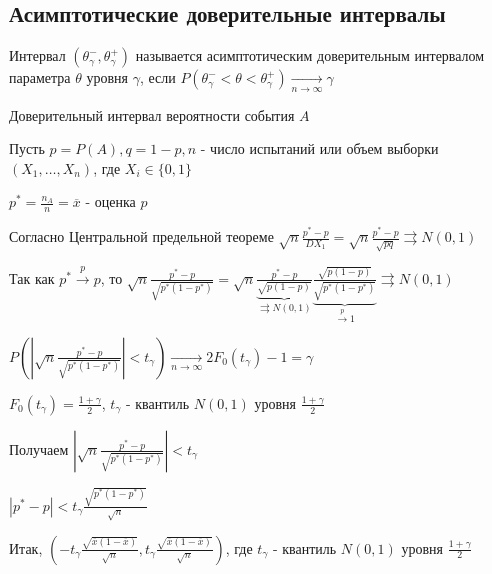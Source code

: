 \subsection{Асимптотические доверительные интервалы}

\Def Интервал $(\theta^-_\gamma, \theta^+_\gamma)$ называется асимптотическим доверительным интервалом параметра $\theta$ 
уровня $\gamma$, если $P(\theta^-_\gamma < \theta < \theta^+_\gamma) \underset{n \to \infty}{\longrightarrow} \gamma$

\Ex Доверительный интервал вероятности события $A$

Пусть $p = P(A), q = 1 - p, n$ - число испытаний или объем выборки $(X_1, \dots, X_n)$, где $X_i \in \{0, 1\}$

$p^* = \frac{n_A}{n} = \overline{x}$ - оценка $p$

Согласно Центральной предельной теореме $\sqrt{n} \frac{p^* - p}{D X_1} = \sqrt{n} \frac{p^* - p}{\sqrt{pq}} \rightrightarrows N(0, 1)$

Так как $p^* \overset{p}{\longrightarrow} p$, то $\sqrt{n} \frac{p^* - p}{\sqrt{p^* (1 - p^*)}} = 
\sqrt{n} \underset{\rightrightarrows N(0, 1)}{\underbrace{\frac{p^* - p}{\sqrt{p (1 - p)}}}} \underset{\overset{p}{\longrightarrow} 1}{\underbrace{\frac{\sqrt{p (1 - p)}}{\sqrt{p^* (1 - p^*)}}}} \rightrightarrows N(0, 1)$


$P\left(\left|\sqrt{n} \frac{p^* - p}{\sqrt{p^* (1 - p^*)}}\right| < t_\gamma\right) \underset{n \to \infty}{\longrightarrow} 2F_0(t_\gamma) - 1 = \gamma$

$F_0(t_\gamma) = \frac{1 + \gamma}{2}$, $t_\gamma$ - квантиль $N(0, 1)$ уровня $\frac{1 + \gamma}{2}$

Получаем $\left|\sqrt{n} \frac{p^* - p}{\sqrt{p^* (1 - p^*)}}\right| < t_\gamma$

$|p^* - p| < t_\gamma \frac{\sqrt{p^* (1 - p^*)}}{\sqrt{n}}$

Итак, $\left(-t_\gamma \frac{\sqrt{\overline{x} (1 - \overline{x})}}{\sqrt{n}}, t_\gamma \frac{\sqrt{\overline{x} (1 - \overline{x})}}{\sqrt{n}}\right)$, где $t_\gamma$ - квантиль $N(0, 1)$ уровня $\frac{1 + \gamma}{2}$



